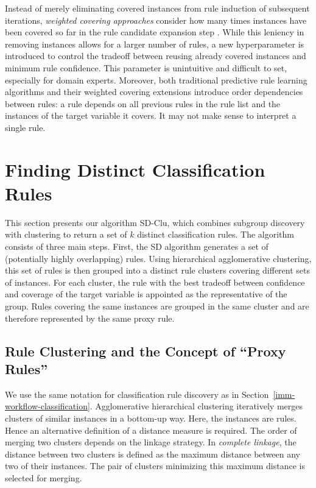 \documentclass[
  oneside]{book}
\begin{document}
Instead of merely eliminating covered instances from rule induction of subsequent iterations, \emph{weighted covering approaches} consider how many times instances have been covered so far in the rule candidate expansion step \autocite{Lavravc:CN2-SD04}.
While this leniency in removing instances allows for a larger number of rules, a new hyperparameter is introduced to control the tradeoff between reusing already covered instances and minimum rule confidence.
This parameter is unintuitive and difficult to set, especially for domain experts.
Moreover, both traditional predictive rule learning algorithms and their weighted covering extensions introduce order dependencies between rules: a rule depends on all previous rules in the rule list and the instances of the target variable it covers.
It may not make sense to interpret a single rule.

\hypertarget{sdclu-method}{%
\section{Finding Distinct Classification Rules}\label{sdclu-method}}

This section presents our algorithm SD-Clu, which combines subgroup discovery with clustering to return a set of \(k\) distinct classification rules.
The algorithm consists of three main steps.
First, the SD algorithm generates a set of (potentially highly overlapping) rules.
Using hierarchical agglomerative clustering, this set of rules is then grouped into a distinct rule clusters covering different sets of instances.
For each cluster, the rule with the best tradeoff between confidence and coverage of the target variable is appointed as the representative of the group.
Rules covering the same instances are grouped in the same cluster and are therefore represented by the same proxy rule.

\hypertarget{sdclu-method-proxy-rules}{%
\subsection{Rule Clustering and the Concept of ``Proxy Rules''}\label{sdclu-method-proxy-rules}}

We use the same notation for classification rule discovery as in Section~\ref{imm-workflow-classification}.
Agglomerative hierarchical clustering iteratively merges clusters of similar instances in a bottom-up way.
Here, the instances are rules.
Hence an alternative definition of a distance measure is required.
The order of merging two clusters depends on the linkage strategy.
In \emph{complete linkage}, the distance between two clusters is defined as the maximum distance between any two of their instances.
The pair of clusters minimizing this maximum distance is selected for merging.
\end{document}
